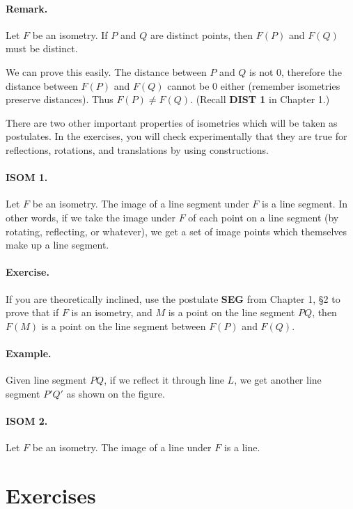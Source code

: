 \documentclass[12pt]{book} %
\begin{document}
\begin{ExerciseList}
\paragraph{Remark.}
Let $F$ be an isometry. If $P$ and $Q$ are distinct points, then $F(P)$ and $F(Q)$ must be distinct.

We can prove this easily. The distance between $P$ and $Q$ is not 0, therefore the distance between $F(P)$ and $F(Q)$ cannot be 0 either (remember isometries preserve distances). Thus $F(P)\ne F(Q)$. (Recall \textbf{DIST 1} in Chapter 1.)

There are two other important properties of isometries which will be taken as postulates. In the exercises, you will check experimentally that they are true for reflections, rotations, and translations by using constructions.

\paragraph{ISOM 1.}
Let $F$ be an isometry. The image of a line segment under $F$ is a line segment. In other words, if we take the image under $F$ of each point on a line segment (by rotating, reflecting, or whatever), we get a set of image points which themselves make up a line segment.

\paragraph{Exercise.}
If you are theoretically inclined, use the postulate \textbf{SEG} from Chapter 1, \S2 to prove that if $F$ is an isometry, and $M$ is a point on the line segment $PQ$, then $F(M)$ is a point on the line segment between $F(P)$ and $F(Q)$.

\paragraph{Example.}
Given line segment $PQ$, if we reflect it through line $L$, we get another line segment $P'Q'$ as shown on the figure.


\paragraph{ISOM 2.}
Let $F$ be an isometry. The image of a line under $F$ is a line.

\section*{Exercises}


\end{ExerciseList}
\end{document}
